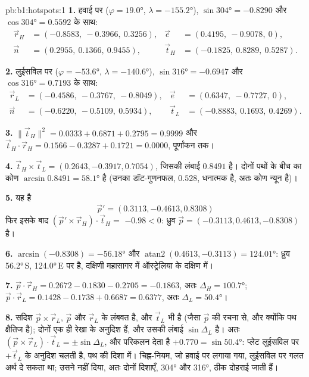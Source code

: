 \begin{solution}{pb:b1:hotspots:1}
\textbf{1.} हवाई पर ($\varphi = \ang{19.0}$, $\lambda = \ang{-155.2}$),
$\sin\ang{304} = -0.8290$ और $\cos\ang{304} = 0.5592$ के साथ:
\[
\begin{aligned}
  \vec r_H &= (-0.8583,\ -0.3966,\ 0.3256), &
  \vec e &= (0.4195,\ -0.9078,\ 0),\\
  \vec n &= (0.2955,\ 0.1366,\ 0.9455), &
  \vec t_H &= (-0.1825,\ 0.8289,\ 0.5287).
\end{aligned}
\]

\textbf{2.} लुईसविल पर ($\varphi = \ang{-53.6}$, $\lambda = \ang{-140.6}$),
$\sin\ang{316} = -0.6947$ और $\cos\ang{316} = 0.7193$ के साथ:
\[
\begin{aligned}
  \vec r_L &= (-0.4586,\ -0.3767,\ -0.8049), &
  \vec e &= (0.6347,\ -0.7727,\ 0),\\
  \vec n &= (-0.6220,\ -0.5109,\ 0.5934), &
  \vec t_L &= (-0.8883,\ 0.1693,\ 0.4269).
\end{aligned}
\]

\textbf{3.} $\lVert\vec t_H\rVert^2 = 0.0333 + 0.6871 + 0.2795 = 0.9999$ और
$\vec t_H\cdot\vec r_H = 0.1566 - 0.3287 + 0.1721 = 0.0000$, पूर्णांकन तक।

\textbf{4.} $\vec t_H\times\vec t_L = (0.2643, -0.3917, 0.7054)$, जिसकी लंबाई
$0.8491$ है। दोनों पथों के बीच का कोण $\arcsin0.8491 = \ang{58.1}$ है (उनका डॉट-गुणनफल, $0.528$, धनात्मक है, अतः कोण न्यून है)।

\textbf{5.} यह है
\[ \vec p' = (0.3113, -0.4613, 0.8308) \]
फिर इसके बाद $(\vec p'\times\vec r_H)\cdot\vec t_H =$ $-0.98 < 0$: ध्रुव
$\vec p = (-0.3113, 0.4613, -0.8308)$ है।

\textbf{6.} $\arcsin(-0.8308) = \ang{-56.18}$ और
$\operatorname{atan2}(0.4613, -0.3113) = \ang{124.01}$: ध्रुव \ang{56.2}\,S, \ang{124.0}\,E पर है, दक्षिणी महासागर में ऑस्ट्रेलिया के दक्षिण में।

\textbf{7.} $\vec p\cdot\vec r_H = 0.2672 - 0.1830 - 0.2705 = -0.1863$, अतः
$\Delta_H = \ang{100.7}$; $\vec p\cdot\vec r_L = 0.1428 - 0.1738 + 0.6687 =
0.6377$, अतः $\Delta_L = \ang{50.4}$।

\textbf{8.} सदिश $\vec p\times\vec r_L$, $\vec p$ और $\vec r_L$ के लंबवत है, और $\vec t_L$ भी है (जैसा $\vec p$ की रचना से, और क्योंकि पथ क्षैतिज है); दोनों एक ही रेखा के अनुदिश हैं, और उसकी लंबाई $\sin\Delta_L$ है। अतः $(\vec p\times\vec r_L)\cdot\vec t_L = \pm\sin\Delta_L$, और परिकलन देता है $+0.770 = \sin\ang{50.4}$: प्लेट लुईसविल पर $+\vec t_L$ के अनुदिश चलती है, पथ की दिशा में। चिह्न-नियम, जो हवाई पर लगाया गया, लुईसविल पर गलत अर्थ दे सकता था; उसने नहीं दिया, अतः दोनों दिशाएँ, \ang{304} और \ang{316}, ठीक दोहराई जाती हैं।


\end{solution}
